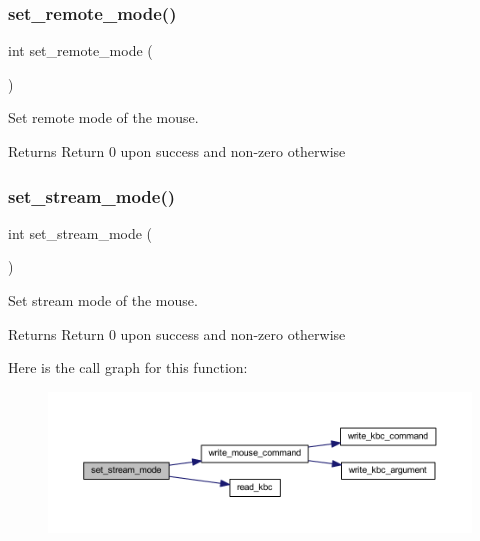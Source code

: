 \subsubsection{\texorpdfstring{set\_remote\_mode()}{set\_remote\_mode()}}
{\footnotesize\ttfamily int set\+\_\+remote\+\_\+mode (\begin{DoxyParamCaption}{ }\end{DoxyParamCaption})}



Set remote mode of the mouse. 

\begin{DoxyReturn}{Returns}
Return 0 upon success and non-\/zero otherwise 
\end{DoxyReturn}
\mbox{\label{group__mouse_gabf86ae410ee145ab149b704b7c09d4a0}} 
\subsubsection{\texorpdfstring{set\_stream\_mode()}{set\_stream\_mode()}}
{\footnotesize\ttfamily int set\+\_\+stream\+\_\+mode (\begin{DoxyParamCaption}{ }\end{DoxyParamCaption})}



Set stream mode of the mouse. 

\begin{DoxyReturn}{Returns}
Return 0 upon success and non-\/zero otherwise 
\end{DoxyReturn}
Here is the call graph for this function\+:
\nopagebreak
\begin{figure}[H]
\begin{center}
\leavevmode
\includegraphics[width=350pt]{group__mouse_gabf86ae410ee145ab149b704b7c09d4a0_cgraph}
\end{center}
\end{figure}
\mbox{\label{group__mouse_gabf7bb26fb5683538fbe802be6df228f1}} 
